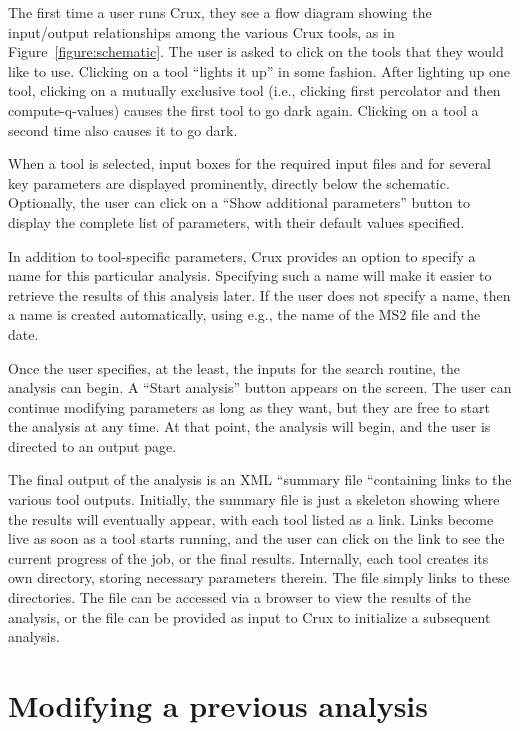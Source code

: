 \documentclass{article}
\begin{document}
The first time a user runs Crux, they see a flow diagram showing the
input/output relationships among the various Crux tools, as in
Figure~\ref{figure:schematic}.  The user is asked to click on the
tools that they would like to use.  Clicking on a tool ``lights it
up'' in some fashion.  After lighting up one tool, clicking on a
mutually exclusive tool (i.e., clicking first percolator and then
compute-q-values) causes the first tool to go dark again.  Clicking on
a tool a second time also causes it to go dark.

When a tool is selected, input boxes for the required input files and
for several key parameters are displayed prominently, directly below
the schematic.  Optionally, the user can click on a ``Show additional
parameters'' button to display the complete list of parameters, with
their default values specified.

In addition to tool-specific parameters, Crux provides an option to
specify a name for this particular analysis.  Specifying such a name
will make it easier to retrieve the results of this analysis later.
If the user does not specify a name, then a name is created
automatically, using e.g., the name of the MS2 file and the date.

Once the user specifies, at the least, the inputs for the search
routine, the analysis can begin.  A ``Start analysis'' button appears
on the screen.  The user can continue modifying parameters as long as
they want, but they are free to start the analysis at any time.  At
that point, the analysis will begin, and the user is directed to an
output page.

The final output of the analysis is an XML ``summary file ``containing
links to the various tool outputs.  Initially, the summary file is
just a skeleton showing where the results will eventually appear, with
each tool listed as a link.  Links become live as soon as a tool
starts running, and the user can click on the link to see the current
progress of the job, or the final results.  Internally, each tool
creates its own directory, storing necessary parameters therein.  The
file simply links to these directories.  The file can be accessed via
a browser to view the results of the analysis, or the file can be
provided as input to Crux to initialize a subsequent analysis.

\section{Modifying a previous analysis}
\end{document}
